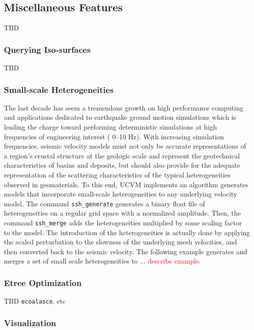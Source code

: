 \subsection{Miscellaneous Features}

TBD

\subsubsection{Querying Iso-surfaces}

TBD 


\subsubsection{Small-scale Heterogeneities}

The last decade has seem a tremendous growth on high performance computing and applications dedicated to earthquake ground motion simulations which is leading the charge toward performing deterministic simulations at high frequencies of engineering interest (\fmax{} 0--10 Hz). With increasing simulation frequencies, seismic velocity models must not only be accurate representations of a region's crustal structure at the geologic scale and represent the geotechnical characteristics of basins and deposits, but should also provide for the adequate representation of the scattering characteristics of the typical heterogeneities observed in geomaterials. To this end, UCVM implements an algorithm generates models that incorporate small-scale heterogeneities to any underlying velocity model. The command \texttt{ssh\_generate} generates a binary float file of heterogeneities on a regular grid space with a normalized amplitude. Then, the command \texttt{ssh\_merge} adds the heterogeneities multiplied by some scaling factor to the model. The introduction of the heterogeneities is actually done by applying the scaled perturbation to the slowness of the underlying mesh velocities, and then converted back to the seismic velocity. The following example generates and merges a set of small scale heterogeneities to ... \textcolor{red}{describe example}.

\subsubsection{Etree Optimization}

TBD \texttt{ecoalasce}, etc

\subsubsection{Visualization}

